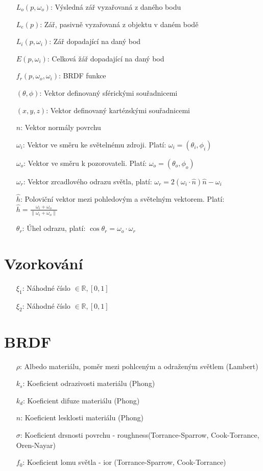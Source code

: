 \documentclass[czech,master]{diploma}
\newcommand{\interval}[1]{\left[{#1}\right]}
\newcommand{\uvec}[1]{\hat{#1}}
\newcommand{\point}{p}
\newcommand{\brdf}{f_r\left(\point,\omega_{o},\omega_{i}\right)}
\newcommand{\normVec}{\uvec{n}}
\newcommand{\inVec}{\omega_{i}}
\newcommand{\outVec}{\omega_{o}}
\newcommand{\refl}{\omega_{r}}
\newcommand{\halfVec}{\uvec{h}}
\newcommand{\outRadiance}{L_o \left( \point,\outVec \right)}
\newcommand{\inRadiance}{L_i \left( \point,\inVec \right)}
\newcommand{\emitRadiance}{L_e \left( \point \right)}
\newcommand{\irradiance}{E \left( \point, \inVec \right)}
\newcommand{\randU}{\xi_{1}}
\newcommand{\randV}{\xi_{2}}
\newcommand{\alb}{\rho}
\newcommand{\rough}{\sigma}
\newcommand{\ior}{f_0}
\begin{document}
\begin{itemize}
  \item[\(\outRadiance\):] Výsledná zář vyzařovaná z daného bodu
  \item[\(\emitRadiance\):] Zář, pasivně vyzařovaná z objektu v daném bodě
  \item[\(\inRadiance\):] Zář dopadající na daný bod
  \item[\(\irradiance\):] Celková žář dopadající na daný bod
  \item[\(\brdf\):] BRDF funkce
  \item[\(\left(\theta,\phi\right)\):] Vektor definovaný sférickými souřadnicemi
  \item[\(\left(x,y,z\right)\):] Vektor definovaný kartézskými souřadnicemi
  \item[\(\normVec\):] Vektor normály povrchu
  \item[\(\inVec\):] Vektor ve směru ke světelnému zdroji. Platí: \(\inVec = \left(\theta_i,\phi_i\right)\)
  \item[\(\outVec\):] Vektor ve směru k pozorovateli. Platí: \(\outVec = \left(\theta_o,\phi_o\right)\)
  \item[\(\refl\):] Vektor zrcadlového odrazu světla, platí: \(\refl = 2\left(\inVec\cdot\normVec\right)\normVec-\inVec\)
  \item[\(\halfVec\):] Poloviční vektor mezi pohledovým a světelným vektorem. Platí: \(\halfVec = \frac{\inVec + \outVec}{\| \inVec + \outVec\|}\)
  \item[\(\theta_r\):] Úhel odrazu, platí: \(\cos\theta_r = \outVec\cdot\refl\)
\end{itemize}

\section{Vzorkování}

\begin{itemize}
  \item[\(\randU\):] Náhodné číslo $\in \mathbb{R}, \interval{0,1}$
  \item[\(\randV\):] Náhodné číslo $\in \mathbb{R}, \interval{0,1}$
\end{itemize}

\section{BRDF}

\begin{itemize}
  \item[\(\alb\):] Albedo materiálu, poměr mezi pohlceným a odraženým světlem (Lambert)
  \item[\(k_s\):] Koeficient odrazivosti materiálu (Phong)
  \item[\(k_d\):] Koeficient difuze materiálu (Phong)
  \item[\(n\):] Koeficient lesklosti materiálu (Phong)
  \item[\(\rough\):] Koeficient drsnosti povrchu - roughness(Torrance-Sparrow, Cook-Torrance, Oren-Nayar)
  \item[\(\ior\):] Koeficient lomu světla - ior (Torrance-Sparrow, Cook-Torrance)
\end{itemize}
\end{document}
